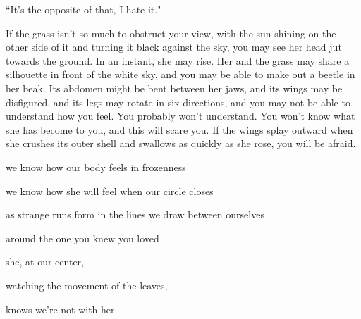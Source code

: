\documentclass[11pt]{article}
\begin{document}
\begingroup
\begin{center}
``It's the opposite of that, I hate it."
\end{center}
\endgroup

\vspace*{2\baselineskip}

\begingroup
If the grass isn't so much to obstruct your view, with the sun shining on the other side of it and turning it black against the sky, you may see her head jut towards the ground. In an instant, she may rise. Her and the grass may share a silhouette in front of the white sky, and you may be able to make out a beetle in her beak. Its abdomen might be bent between her jaws, and its wings may be disfigured, and its legs may rotate in six directions, and you may not be able to understand how you feel. You probably won't understand. You won't know what she has become to you, and this will scare you. If the wings splay outward when she crushes its outer shell and swallows as quickly as she rose, you will be afraid.
\endgroup

\vspace*{2\baselineskip}

\begingroup
\begin{center}
we know how our body feels in frozenness
\rightskip\leftskip
\end{center}
\endgroup

\begingroup
\begin{center}
we know how she will feel when our circle closes
\rightskip\leftskip
\end{center}
\endgroup

\begingroup
\begin{center}
as strange runs form in the lines we draw between ourselves
\rightskip\leftskip
\end{center}
\endgroup

\begingroup
\begin{center}
around the one you knew you loved
\rightskip\leftskip
\end{center}
\endgroup

\begingroup
\begin{center}
she, at our center,
\rightskip\leftskip
\end{center}
\endgroup

\begingroup
\begin{center}
watching the movement of the leaves,
\rightskip\leftskip
\end{center}
\endgroup

\begingroup
\begin{center}
knows we're not with her
\rightskip\leftskip
\end{center}
\endgroup

\vspace*{2\baselineskip}
\end{document}

